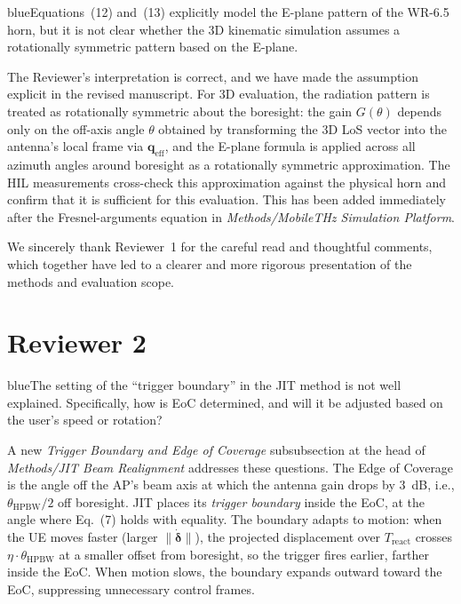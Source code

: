 \documentclass{article}
\newcommand{\blue}[1]{\begin{color}{blue}#1\end{color}}
\begin{document}
\begin{tcbremark}
{\selectfont
\blue{Equations~(12) and~(13) explicitly model the E-plane pattern of the WR-6.5 horn, but it is not clear whether the 3D kinematic simulation assumes a rotationally symmetric pattern based on the E-plane.}
}
\end{tcbremark}

\noindent The Reviewer's interpretation is correct, and we have made the assumption explicit in the revised manuscript. For 3D evaluation, the radiation pattern is treated as rotationally symmetric about the boresight: the gain $G(\theta)$ depends only on the off-axis angle $\theta$ obtained by transforming the 3D LoS vector into the antenna's local frame via $\mathbf{q}_{\text{eff}}$, and the E-plane formula is applied across all azimuth angles around boresight as a rotationally symmetric approximation. The HIL measurements cross-check this approximation against the physical horn and confirm that it is sufficient for this evaluation. This has been added immediately after the Fresnel-arguments equation in \emph{Methods/MobileTHz Simulation Platform}.

\bigskip
\noindent We sincerely thank Reviewer~1 for the careful read and thoughtful comments, which together have led to a clearer and more rigorous presentation of the methods and evaluation scope.

\newpage

\section*{Reviewer 2}

\begin{tcbremark}
{\selectfont
\blue{The setting of the ``trigger boundary'' in the JIT method is not well explained. Specifically, how is EoC determined, and will it be adjusted based on the user's speed or rotation?}
}
\end{tcbremark}

\noindent A new \emph{Trigger Boundary and Edge of Coverage} subsubsection at the head of \emph{Methods/JIT Beam Realignment} addresses these questions. The Edge of Coverage is the angle off the AP's beam axis at which the antenna gain drops by \SI{3}{\deci\bel}, i.e., $\theta_{\text{HPBW}}/2$ off boresight. JIT places its \emph{trigger boundary} inside the EoC, at the angle where Eq.~(7) holds with equality. The boundary adapts to motion: when the UE moves faster (larger $\|\dot{\boldsymbol\delta}\|$), the projected displacement over $T_{\text{react}}$ crosses $\eta \cdot \theta_{\text{HPBW}}$ at a smaller offset from boresight, so the trigger fires earlier, farther inside the EoC. When motion slows, the boundary expands outward toward the EoC, suppressing unnecessary control frames.
\end{document}
